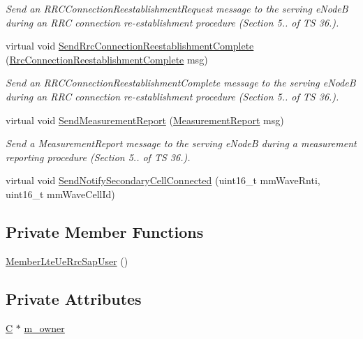 \begin{DoxyCompactItemize}
\begin{DoxyCompactList}\small\item\em Send an {\itshape R\+R\+C\+Connection\+Reestablishment\+Request} message to the serving e\+NodeB during an R\+RC connection re-\/establishment procedure (Section 5.. of TS 36.). \end{DoxyCompactList}\item 
virtual void \hyperlink{classns3_1_1MemberLteUeRrcSapUser_a94700253e2809d46f4d23bcb0c0ff6f2}{Send\+Rrc\+Connection\+Reestablishment\+Complete} (\hyperlink{structns3_1_1LteRrcSap_1_1RrcConnectionReestablishmentComplete}{Rrc\+Connection\+Reestablishment\+Complete} msg)
\begin{DoxyCompactList}\small\item\em Send an {\itshape R\+R\+C\+Connection\+Reestablishment\+Complete} message to the serving e\+NodeB during an R\+RC connection re-\/establishment procedure (Section 5.. of TS 36.). \end{DoxyCompactList}\item 
virtual void \hyperlink{classns3_1_1MemberLteUeRrcSapUser_a087f34b983a6c55d9709bcbaf9d57237}{Send\+Measurement\+Report} (\hyperlink{structns3_1_1LteRrcSap_1_1MeasurementReport}{Measurement\+Report} msg)
\begin{DoxyCompactList}\small\item\em Send a {\itshape Measurement\+Report} message to the serving e\+NodeB during a measurement reporting procedure (Section 5.. of TS 36.). \end{DoxyCompactList}\item 
virtual void \hyperlink{classns3_1_1MemberLteUeRrcSapUser_a5c9dccca1fa3ace56b78f8105ecf0b07}{Send\+Notify\+Secondary\+Cell\+Connected} (uint16\+\_\+t mm\+Wave\+Rnti, uint16\+\_\+t mm\+Wave\+Cell\+Id)
\end{DoxyCompactItemize}
\subsection*{Private Member Functions}
\begin{DoxyCompactItemize}
\item 
\hyperlink{classns3_1_1MemberLteUeRrcSapUser_acfeddb3e8c9da7c69ff00b8aa1798bce}{Member\+Lte\+Ue\+Rrc\+Sap\+User} ()
\end{DoxyCompactItemize}
\subsection*{Private Attributes}
\begin{DoxyCompactItemize}
\item 
\hyperlink{loss__COST231__small__cities__urban_8m_aaa53ca0b650dfd85c4f59fa156f7a2cc}{C} $\ast$ \hyperlink{classns3_1_1MemberLteUeRrcSapUser_af692e5292db4bc830c0c4b718b9a283a}{m\+\_\+owner}
\end{DoxyCompactItemize}
